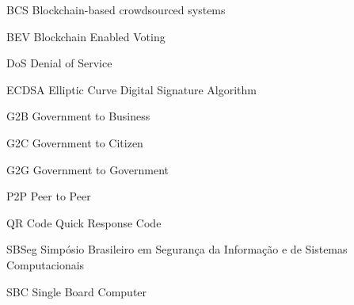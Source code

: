 
\begin{siglas}
  \item[BCS] Blockchain-based crowdsourced systems
  \item[BEV] Blockchain Enabled Voting
  \item[DoS] Denial of Service
  \item[ECDSA] Elliptic Curve Digital Signature Algorithm
  \item[G2B] Government to Business
  \item[G2C] Government to Citizen
  \item[G2G] Government to Government
  \item[P2P] Peer to Peer
  \item[QR Code] Quick Response Code
  \item[SBSeg] Simpósio Brasileiro em Segurança da Informação e de Sistemas Computacionais
  \item[SBC] Single Board Computer
  
\end{siglas}